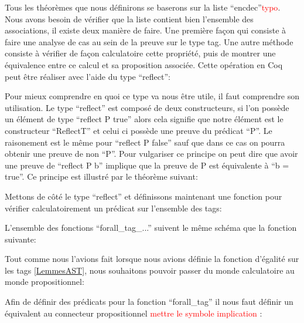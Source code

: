 \documentclass {article}
\newcommand{\codefrom}[3]
           {}
\theoremstyle{definition}
\theoremstyle{remark}
\newcommand{\todo}[1]{\textcolor{red}{#1}}
\begin{document}
Tous les théorèmes que nous définirons se baserons sur la liste ``encdec''\todo{typo}. \\
Nous avons besoin de vérifier que la liste contient bien l'ensemble des associations,
il existe deux manière de faire. Une première façon qui consiste à faire une analyse de cas
au sein de la preuve sur le type tag.
Une autre méthode consiste à vérifier de façon calculatoire cette propriété, puis de montrer
une équivalence entre ce calcul et sa proposition associée. 
Cette opération en Coq peut être réaliser avec l'aide du type ``reflect'':

\codefrom{rapport}{definitions}{reflect}

Pour mieux comprendre en quoi ce type va nous être utile, il faut comprendre son utilisation.
Le type ``reflect'' est composé de deux constructeurs, si l'on possède un élément de type
``reflect P true'' alors cela signifie que notre élément est le constructeur ``ReflectT''
et celui ci possède une preuve du prédicat ``P''. Le raisonement est le même pour ``reflect P false''
sauf que dans ce cas on pourra obtenir une preuve de non ``P''. Pour vulgariser ce
principe on peut dire que avoir une preuve de ``reflect P b'' implique que la preuve
de P est équivalente à ``b = true''. Ce principe est illustré par le théorème suivant:

\codefrom{rapport}{definitions}{reflect_iff}


Mettons de côté le type ``reflect'' et définissons maintenant une fonction
pour vérifier calculatoirement un prédicat sur l'ensemble des tags:

\codefrom{src}{association_list}{forall_tag}

L'ensemble des fonctions ``forall\_tag\_...'' suivent le même schéma que la fonction suivante:

\codefrom{src}{association_list}{forall_tag_uno}

Tout comme nous l'avions fait lorsque nous avions définie la fonction d'égalité sur les tags \ref{LemmesAST},
nous souhaitons pouvoir passer du monde calculatoire au monde propositionnel:

\codefrom{src}{association_list}{helpBefore1}
\codefrom{src}{association_list}{helpBefore2}

Afin de définir des prédicats pour la fonction ``forall\_tag'' il nous faut définir un
équivalent au connecteur propositionnel \todo{mettre le symbole implication} :

\codefrom{src}{association_list}{imply}
\end{document}
